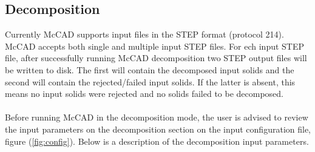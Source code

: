\documentclass[12pt, a4paper, titlepage]{article}
\begin{document}
  \subsection{Decomposition}
    Currently McCAD supports input files in the STEP format (protocol 214). McCAD accepts both single and multiple input STEP files. For ech input STEP file, after successfully running McCAD decomposition two STEP output files will be written to disk. The first will contain the decomposed input solids and the second will contain the rejected/failed input solids. If the latter is absent, this means no input solids were rejected and no solids failed to be decomposed. \\
    \\
    Before running McCAD in the decomposition mode, the user is advised to review the input parameters on the decomposition section on the input configuration file, figure (\ref{fig:config}). Below is a description of the decomposition input parameters.
\end{document}
